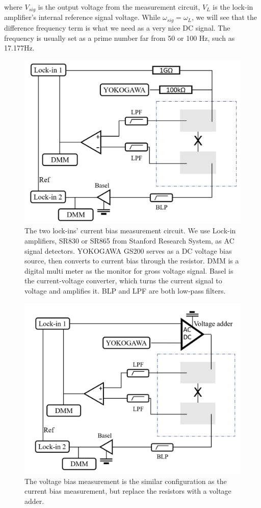 where $V_{sig}$ is the output voltage from the measurement circuit, $V_L$ is the lock-in amplifier's internal reference signal voltage. While $\omega_{sig} = \omega_L$, we will see that the difference frequency term is what we need as a very nice DC signal. The frequency is usually set as a prime number far from 50 or 100 Hz, such as 17.177Hz.
\begin{figure}[h!]
    \centering
    \includegraphics[width=0.65\linewidth]{Pic/Ibias_circuit.png}
    \caption{The two lock-ins' current bias measurement circuit. We use Lock-in amplifiers, SR830 or SR865 from Stanford Research System, as AC signal detectors. YOKOGAWA GS200 serves as a DC voltage bias source, then converts to current bias through the resistor. DMM is a digital multi meter as the monitor for gross voltage signal. Basel is the current-voltage converter, which turns the current signal to voltage and amplifies it. BLP and LPF are both low-pass filters. }
    \label{IbiasDCmsmt}
\end{figure}
\begin{figure}[h!]
    \centering
    \includegraphics[width=0.65\linewidth]{Pic/Vbias_circuit.png}
    \caption{The voltage bias measurement is the similar configuration as the current bias measurement, but replace the resistors with a voltage adder.}
    \label{VbiasDCmsmt}
\end{figure}
